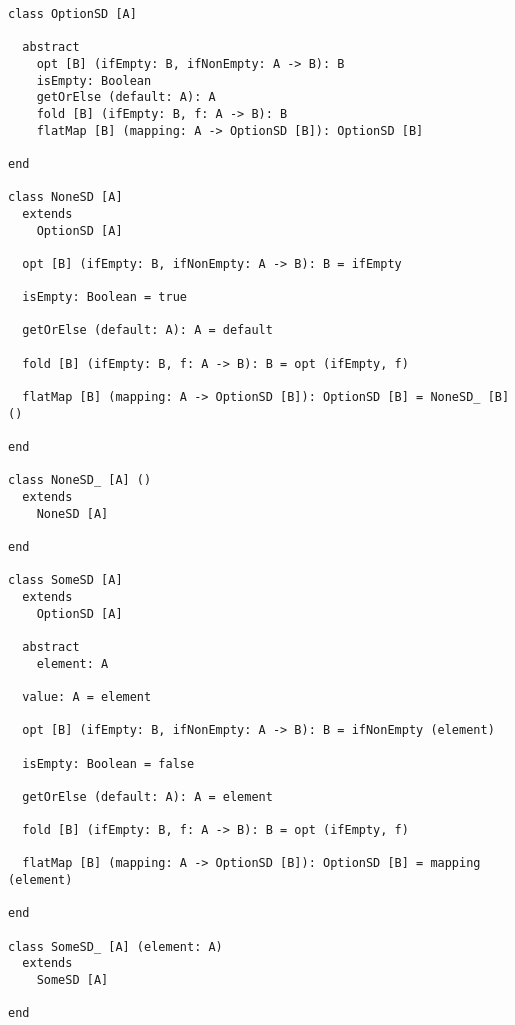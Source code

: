 \begin{lstlisting}[label={lst:option}]
class OptionSD [A]

  abstract
    opt [B] (ifEmpty: B, ifNonEmpty: A -> B): B
    isEmpty: Boolean
    getOrElse (default: A): A
    fold [B] (ifEmpty: B, f: A -> B): B
    flatMap [B] (mapping: A -> OptionSD [B]): OptionSD [B]

end

class NoneSD [A]
  extends
    OptionSD [A]

  opt [B] (ifEmpty: B, ifNonEmpty: A -> B): B = ifEmpty

  isEmpty: Boolean = true

  getOrElse (default: A): A = default

  fold [B] (ifEmpty: B, f: A -> B): B = opt (ifEmpty, f)

  flatMap [B] (mapping: A -> OptionSD [B]): OptionSD [B] = NoneSD_ [B] ()

end

class NoneSD_ [A] ()
  extends
    NoneSD [A]

end

class SomeSD [A]
  extends
    OptionSD [A]

  abstract
    element: A

  value: A = element

  opt [B] (ifEmpty: B, ifNonEmpty: A -> B): B = ifNonEmpty (element)

  isEmpty: Boolean = false

  getOrElse (default: A): A = element

  fold [B] (ifEmpty: B, f: A -> B): B = opt (ifEmpty, f)

  flatMap [B] (mapping: A -> OptionSD [B]): OptionSD [B] = mapping (element)

end

class SomeSD_ [A] (element: A)
  extends
    SomeSD [A]

end
\end{lstlisting}

